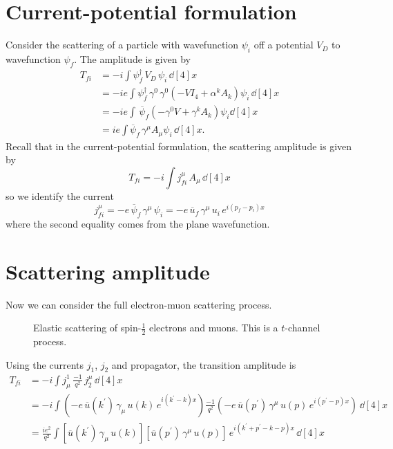 \documentclass{report}
\begin{document}
\section{Current-potential formulation}
Consider the scattering of a particle with wavefunction $\psi_i$ off a potential $V_D$ to wavefunction $\psi_f$. The amplitude is given by
\begin{align}
T_{fi} &= -i \int \psi_f^\dagger \, V_D \, \psi_i \, \dd[4]{x} \\
&= -ie \int \psi_f^\dagger \, \gamma^0 \, \gamma^0 \left( -VI_4 + \alpha^k A_k \right) \psi_i \, \dd[4]{x} \nonumber \\
&= -ie \int \, \overline{\psi}_f \left( -\gamma^0 V + \gamma^k A_k \right) \psi_i\dd[4]{x} \nonumber \\
&= ie \int \overline{\psi}_f \, \gamma^\mu A_\mu \psi_i \, \dd[4]{x}.
\end{align}
Recall that in the current-potential formulation, the scattering amplitude is given by
\begin{equation}
T_{fi} = -i \int j^\mu_{fi} \, A_\mu \, \dd[4]{x}
\end{equation}
so we identify the current
\begin{equation}
j^\mu_{fi} = -e \, \overline{\psi}_f \, \gamma^\mu \, \psi_i = -e \, \overline{u}_f \, \gamma^\mu \, u_i \, e^{i(p_f - p_i)x}
\end{equation}
where the second equality comes from the plane wavefunction.

\section{Scattering amplitude}
Now we can consider the full electron-muon scattering process.
\begin{figure}[th]
\centering

\caption{Elastic scattering of spin-$\frac{1}{2}$ electrons and muons. This is a $t$-channel process. \label{fig:DiracEMuScatter}}
\end{figure}

Using the currents $j_1$, $j_2$ and propagator, the transition amplitude is
\begin{align}
T_{fi} &= -i \int j_\mu^1 \, \frac{-1}{q^2} \, j^\mu_2 \, \dd[4]{x} \\
&= -i \int \left( -e \, \overline{u}(k^\prime) \, \gamma_\mu \, u(k) \, e^{i(k^\prime - k)x} \right) \frac{-1}{q^2} \left( -e \, \overline{u}(p^\prime) \, \gamma^\mu \, u(p) \, e^{i(p^\prime - p)x} \right) \, \dd[4]{x} \nonumber \\
&= \frac{ie^2}{q^2} \int \left[ \overline{u}(k^\prime) \, \gamma_\mu \, u(k) \right]\left[ \overline{u}(p^\prime) \, \gamma^\mu \, u(p) \right] \, e^{i(k^\prime + p^\prime - k - p)x} \, \dd[4]{x}
\end{align}
\end{document}
